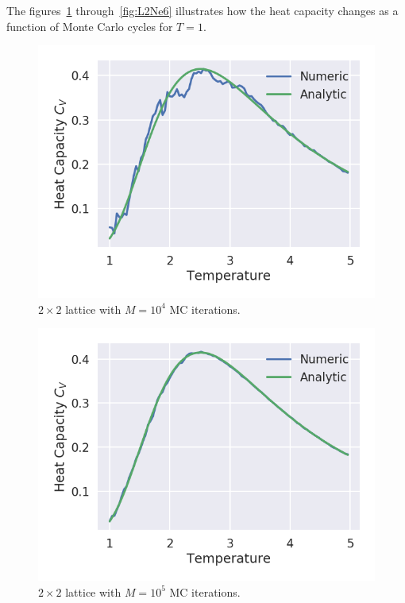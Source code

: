 \documentclass[aps,reprint]{revtex4-1}
\begin{document}
The figures~\ref{fig:L2Ne4} through~\ref{fig:L2Ne6} illustrates how the heat
capacity changes as a function of Monte Carlo cycles for \(T = 1\).

\begin{figure}[H]
  \centering
  \includegraphics[width=\columnwidth]{figures/L2Ne4.png}
  \caption{$2 \times 2$ lattice with $M = 10^4$ MC iterations.}
  \label{fig:L2Ne4}
\end{figure}
\begin{figure}[H]
  \centering
  \includegraphics[width=\columnwidth]{figures/L2Ne5.png}
  \caption{$2 \times 2$ lattice with $M = 10^5$ MC iterations.}
  \label{fig:L2Ne5}
\end{figure}
\end{document}

